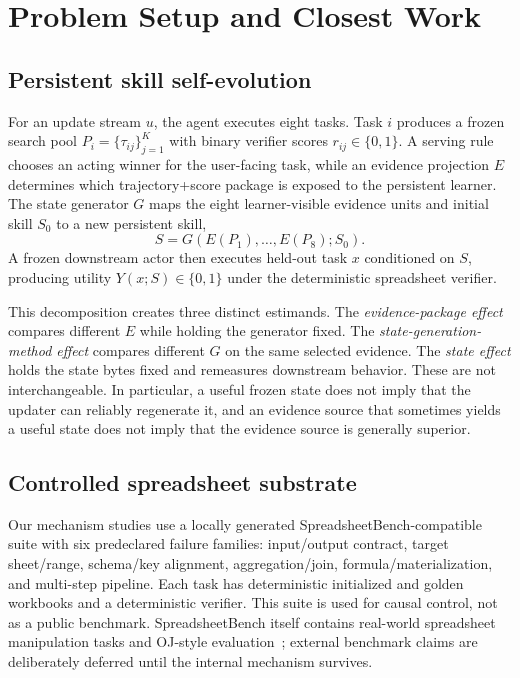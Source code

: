 \section{Problem Setup and Closest Work}
\label{sec:problem}

\subsection{Persistent skill self-evolution}
For an update stream $u$, the agent executes eight tasks. Task $i$ produces a frozen search pool $P_i=\{\tau_{ij}\}_{j=1}^{K}$ with binary verifier scores $r_{ij}\in\{0,1\}$. A serving rule chooses an acting winner for the user-facing task, while an evidence projection $E$ determines which trajectory+score package is exposed to the persistent learner. The state generator $G$ maps the eight learner-visible evidence units and initial skill $S_0$ to a new persistent skill,
\begin{equation}
S = G(E(P_1),\ldots,E(P_8);S_0).
\end{equation}
A frozen downstream actor then executes held-out task $x$ conditioned on $S$, producing utility $Y(x;S)\in\{0,1\}$ under the deterministic spreadsheet verifier.

This decomposition creates three distinct estimands. The \emph{evidence-package effect} compares different $E$ while holding the generator fixed. The \emph{state-generation-method effect} compares different $G$ on the same selected evidence. The \emph{state effect} holds the state bytes fixed and remeasures downstream behavior. These are not interchangeable. In particular, a useful frozen state does not imply that the updater can reliably regenerate it, and an evidence source that sometimes yields a useful state does not imply that the evidence source is generally superior.

\subsection{Controlled spreadsheet substrate}
Our mechanism studies use a locally generated SpreadsheetBench-compatible suite with six predeclared failure families: input/output contract, target sheet/range, schema/key alignment, aggregation/join, formula/materialization, and multi-step pipeline. Each task has deterministic initialized and golden workbooks and a deterministic verifier. This suite is used for causal control, not as a public benchmark. SpreadsheetBench itself contains real-world spreadsheet manipulation tasks and OJ-style evaluation~\citep{ma2024spreadsheetbench}; external benchmark claims are deliberately deferred until the internal mechanism survives.

